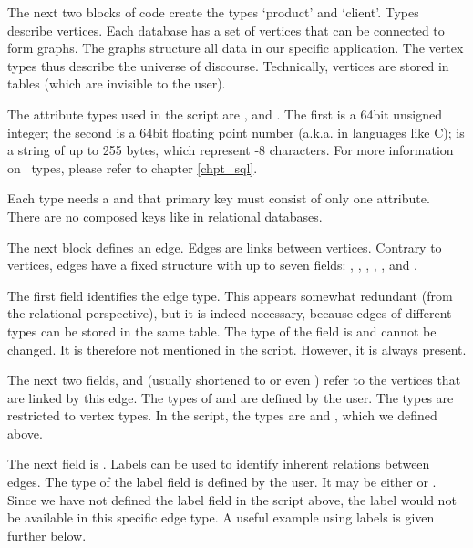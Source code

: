 The next two blocks of code create the types
`product' and `client'.
Types describe vertices.
Each database has a set
of vertices that can be connected to form graphs.
The graphs structure all data
in our specific application.
The vertex types thus describe the universe of discourse.
Technically, vertices are stored in
 tables (which are
invisible to the user).

The attribute types used in the script
are ,  and .
The first is a 64bit unsigned integer;
the second is a 64bit floating point number
(a.k.a.  in languages like C);
 is a string of up to 255 bytes,
which represent -8 characters.
For more information on \sql\ types,
please refer to chapter
\ref{chpt_sql}.

Each type needs a  and
that primary key must consist of only one attribute.
There are no composed keys like in relational
databases.

The next block defines an edge.
Edges are links between vertices.
Contrary to vertices, edges have a fixed structure
with up to seven fields:
, , ,
, ,
 and .

The first field  identifies the edge type.
This appears somewhat redundant (from the relational perspective),
but it is indeed necessary, because
edges of different types can be stored in the same table.
The type of the  field is 
and cannot be changed. It is therefore not mentioned in
the script. However, it is always present.

The next two fields,  and 
(usually shortened to  or even )
refer to the vertices that are linked by this edge.
The types of  and  are defined
by the user. The types are restricted to vertex types.
In the script, the types are
 and ,
which we defined above.

The next field is .
Labels can be used
to identify inherent relations between edges.
The type of the label field is defined by the user.
It may be either  or .
Since we have not defined the label field in the script above,
the label would not be available in this specific edge type.
A useful example using labels is given further below.

